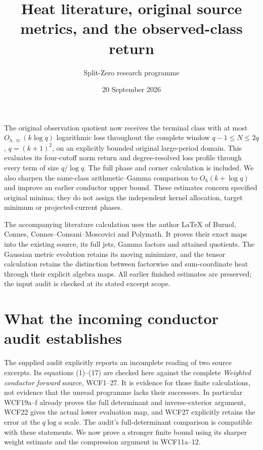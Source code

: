 \documentclass[11pt]{article}
\title{Heat literature, original source metrics, and the observed-class return}
\author{Split-Zero research programme}
\date{20 September 2026}
\theoremstyle{remark}\newtheorem{remark}[theorem]{Remark}
\begin{document}
\maketitle
The original observation quotient now receives the terminal class with
at most $O_{h,\varpi}(k\log q)$ logarithmic loss throughout the complete
window $q-1\le N\le2q$, $q=(k+1)^2$, on an explicitly bounded original
large-period domain. This evaluates its four-cutoff norm return and
degree-resolved loss profile through every term of size $q/\log q$.
The full phase and corner calculation is included. We also sharpen the
same-class arithmetic--Gamma comparison to $O_h(k+\log q)$ and improve
an earlier conductor upper bound. These estimates concern specified
original minima; they do not assign the independent kernel allocation,
target minimum or projected-current phases.

The accompanying literature calculation uses the author LaTeX of
Burnol, Connes, Connes--Consani--Moscovici and Polymath. It proves their
exact maps into the existing source, its full jets, Gamma factors and
attained quotients. The Gaussian metric evolution retains its moving
minimizer, and the tensor calculation retains the distinction between
factorwise and sum-coordinate heat through their explicit algebra maps.
All earlier finished estimates are preserved; the input audit is
checked at its stated excerpt scope.
\tableofcontents

\section{What the incoming conductor audit establishes}
\label{sec:audit}
The supplied audit explicitly reports an incomplete reading of two source
excerpts. Its equations (1)--(17) are checked here against the complete
\emph{Weighted conductor forward} source, WCF1--27. It is evidence for
those finite calculations, not evidence that the unread programme lacks
their successors. In particular WCF19a--f already proves the full
determinant and inverse-exterior argument, WCF22 gives the actual lower
evaluation map, and WCF27 explicitly retains the error at the
$q\log a$ scale. The audit's full-determinant comparison is compatible
with these statements. We now prove a stronger finite bound using its
sharper weight estimate and the compression argument in WCF11a--12.
\end{document}
